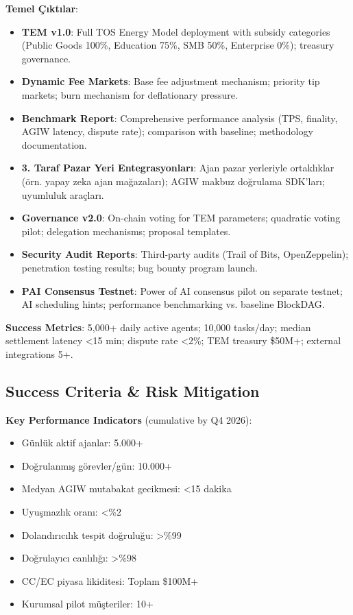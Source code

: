 \documentclass[11pt]{article}
\begin{document}
\begin{itemize}[noitemsep]
\begin{itemize}[noitemsep]
\begin{itemize}[noitemsep]
\begin{itemize}[noitemsep]
\begin{itemize}[noitemsep]
\begin{itemize}[noitemsep]
\begin{itemize}[noitemsep]
\begin{enumerate}[noitemsep]
\begin{itemize}[noitemsep]
\textbf{Temel Çıktılar}:
\begin{itemize}[noitemsep]
  \item \textbf{TEM v1.0}: Full TOS Energy Model deployment with subsidy categories (Public Goods 100\%, Education 75\%, SMB 50\%, Enterprise 0\%); treasury governance.
  \item \textbf{Dynamic Fee Markets}: Base fee adjustment mechanism; priority tip markets; burn mechanism for deflationary pressure.
  \item \textbf{Benchmark Report}: Comprehensive performance analysis (TPS, finality, AGIW latency, dispute rate); comparison with baseline; methodology documentation.
  \item \textbf{3. Taraf Pazar Yeri Entegrasyonları}: Ajan pazar yerleriyle ortaklıklar (örn. yapay zeka ajan mağazaları); AGIW makbuz doğrulama SDK'ları; uyumluluk araçları.
  \item \textbf{Governance v2.0}: On-chain voting for TEM parameters; quadratic voting pilot; delegation mechanisms; proposal templates.
  \item \textbf{Security Audit Reports}: Third-party audits (Trail of Bits, OpenZeppelin); penetration testing results; bug bounty program launch.
  \item \textbf{PAI Consensus Testnet}: Power of AI consensus pilot on separate testnet; AI scheduling hints; performance benchmarking vs. baseline BlockDAG.
\end{itemize}

\textbf{Success Metrics}: 5,000+ daily active agents; 10,000 tasks/day; median settlement latency <15 min; dispute rate <2\%; TEM treasury \$50M+; external integrations 5+.

\subsection{Success Criteria \& Risk Mitigation}

\textbf{Key Performance Indicators} (cumulative by Q4 2026):
\begin{itemize}[noitemsep]
  \item Günlük aktif ajanlar: 5.000+
  \item Doğrulanmış görevler/gün: 10.000+
  \item Medyan AGIW mutabakat gecikmesi: <15 dakika
  \item Uyuşmazlık oranı: <\%2
  \item Dolandırıcılık tespit doğruluğu: >\%99
  \item Doğrulayıcı canlılığı: >\%98
  \item CC/EC piyasa likiditesi: Toplam \$100M+
  \item Kurumsal pilot müşteriler: 10+
\end{itemize}


\end{itemize}
\end{enumerate}
\end{itemize}
\end{itemize}
\end{itemize}
\end{itemize}
\end{itemize}
\end{itemize}
\end{itemize}
\end{document}
